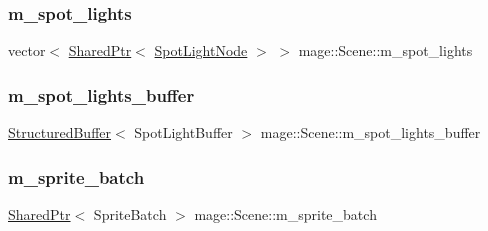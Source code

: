 \subsubsection{\texorpdfstring{m\+\_\+spot\+\_\+lights}{m\_spot\_lights}}
{\footnotesize\ttfamily vector$<$ \hyperlink{namespacemage_a1e01ae66713838a7a67d30e44c67703e}{Shared\+Ptr}$<$ \hyperlink{namespacemage_aeed5dee4ff6c591eabb0e9114256df4a}{Spot\+Light\+Node} $>$ $>$ mage\+::\+Scene\+::m\+\_\+spot\+\_\+lights\hspace{0.3cm}{\ttfamily [private]}}

\hypertarget{classmage_1_1_scene_a64118c052d728ac988031898fd2d757d}{}\label{classmage_1_1_scene_a64118c052d728ac988031898fd2d757d} 
\subsubsection{\texorpdfstring{m\+\_\+spot\+\_\+lights\+\_\+buffer}{m\_spot\_lights\_buffer}}
{\footnotesize\ttfamily \hyperlink{structmage_1_1_structured_buffer}{Structured\+Buffer}$<$ Spot\+Light\+Buffer $>$ mage\+::\+Scene\+::m\+\_\+spot\+\_\+lights\+\_\+buffer\hspace{0.3cm}{\ttfamily [private]}}

\hypertarget{classmage_1_1_scene_a7a334e1b7764532817f10efbc0b91a82}{}\label{classmage_1_1_scene_a7a334e1b7764532817f10efbc0b91a82} 
\subsubsection{\texorpdfstring{m\+\_\+sprite\+\_\+batch}{m\_sprite\_batch}}
{\footnotesize\ttfamily \hyperlink{namespacemage_a1e01ae66713838a7a67d30e44c67703e}{Shared\+Ptr}$<$ Sprite\+Batch $>$ mage\+::\+Scene\+::m\+\_\+sprite\+\_\+batch\hspace{0.3cm}{\ttfamily [private]}}

\hypertarget{classmage_1_1_scene_a7379b399f02999f89f6ccda5bfa01b02}{}\label{classmage_1_1_scene_a7379b399f02999f89f6ccda5bfa01b02} 

